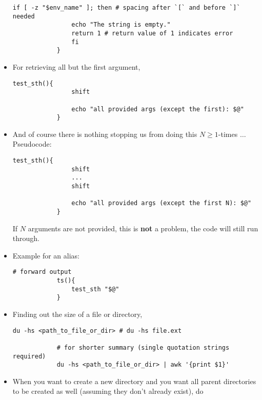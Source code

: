\documentclass[12pt, a4paper]{article}
\numberwithin{equation}{section}
\theoremstyle{definition}
\theoremstyle{definition}
\begin{document}
\begin{itemize}
\begin{lstlisting}[style=mystylebash, label=alg:bash__empty_string_check, caption=Check (e.g.~in if-clause) whether string is empty or not, xleftmargin=\parindent]
				if [ -z "$env_name" ]; then # spacing after `[` and before `]` needed
				echo "The string is empty."
				return 1 # return value of 1 indicates error
				fi
			}
		\end{lstlisting}
	
		\item For retrieving all but the first argument, 
		
		\begin{lstlisting}[style=mystylebash, label=alg:bash__args_shift, xleftmargin=\parindent]
			test_sth(){
				shift
				
				echo "all provided args (except the first): $@"
			}
		\end{lstlisting}
		
		\item And of course there is nothing stopping us from doing this $N\geq 1$-times $\dots$ Pseudocode: 
		
		\begin{lstlisting}[style=mystylebash, label=alg:bash__args_shift_gen, xleftmargin=\parindent]
			test_sth(){
				shift
				...
				shift
				
				echo "all provided args (except the first N): $@"
			}
		\end{lstlisting}
		
		If $N$ arguments are not provided, this is \textbf{not} a problem, the code will still run through.
		
		\item Example for an alias:
		
		\begin{lstlisting}[style=mystylebash, label=alg:bash_aliases, xleftmargin=\parindent]
			# forward output
			ts(){
				test_sth "$@"
			}
		\end{lstlisting}
	
		\item Finding out the size of a file or directory,
		
		\begin{lstlisting}[style=mystylebash, label=alg:dir_size, xleftmargin=\parindent]
			du -hs <path_to_file_or_dir> # du -hs file.ext
			
			# for shorter summary (single quotation strings required)
			du -hs <path_to_file_or_dir> | awk '{print $1}'
		\end{lstlisting}
	
		\item When you want to create a new directory and you want all parent directories to be created as well (assuming they don't already exist), do
		

\end{itemize}
\end{document}
